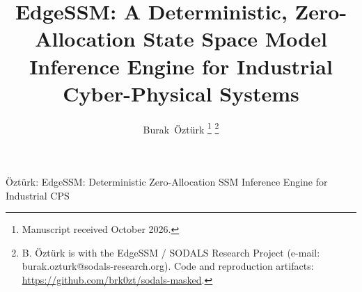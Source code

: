 \documentclass[journal]{IEEEtran}
\begin{document}
\title{EdgeSSM: A Deterministic, Zero-Allocation State Space Model Inference Engine for Industrial Cyber-Physical Systems}

\author{Burak~\"Ozt\"urk%
\thanks{Manuscript received October 2026.}%
\thanks{B. \"Ozt\"urk is with the EdgeSSM / SODALS Research Project (e-mail: burak.ozturk@sodals-research.org). Code and reproduction artifacts: \url{https://github.com/brk0zt/sodals-masked}.}}

%
{\"Ozt\"urk: EdgeSSM: Deterministic Zero-Allocation SSM Inference Engine for Industrial CPS}

\maketitle
\end{document}
